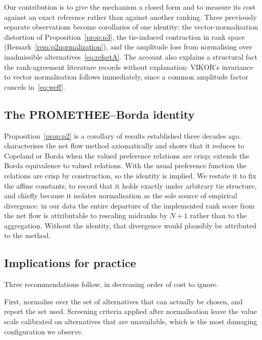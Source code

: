 Our contribution is to give the mechanism a closed form and to measure
its cost against an exact reference rather than against another ranking.
Three previously separate observations become corollaries of one
identity: the vector-normalisation distortion of
Proposition~\ref{prop:p3}, the tie-induced contraction in rank space
(Remark~\ref{rem:p2normalization}), and the amplitude loss from
normalising over inadmissible alternatives~\eqref{eq:refsetA}.
The account also explains a structural fact the rank-agreement literature
records without explanation: VIKOR's invariance to vector normalisation
follows immediately, since a common amplitude factor cancels
in~\eqref{eq:weff}.

\subsection{The PROMETHEE--Borda identity}

Proposition~\ref{prop:p2} is a corollary of results established three
decades ago.
\citet{Bouyssou1992} characterises the net flow method axiomatically and
shows that it reduces to Copeland or Borda when the valued preference
relations are crisp; \citet{Marchant1996} extends the Borda equivalence
to valued relations.
With the usual preference function the relations are crisp by
construction, so the identity is implied.
We restate it to fix the affine constants, to record that it holds
exactly under arbitrary tie structure, and chiefly because it isolates
normalisation as the sole source of empirical divergence: in our data
the entire departure of the implemented rank score from the net flow is
attributable to rescaling midranks by $N+1$ rather than to the
aggregation.
Without the identity, that divergence would plausibly be attributed to
the method.

\subsection{Implications for practice}

Three recommendations follow, in decreasing order of cost to ignore.

First, normalise over the set of alternatives that can actually be
chosen, and report the set used.
Screening criteria applied after normalisation leave the value scale
calibrated on alternatives that are unavailable, which is the most
damaging configuration we observe.

